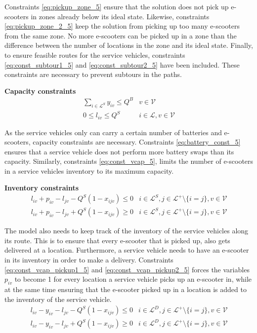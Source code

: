Constraints \eqref{eq:pickup_zone_5} ensure that the solution does not pick up e-scooters in zones already below its ideal state. Likewise, constraints \eqref{eq:pickup_zone_2_5} keep the solution from picking up too many e-scooters from the same zone. No more e-scooters can be picked up in a zone than the difference between the number of locations in the zone and its ideal state. Finally, to ensure feasible routes for the service vehicles, constraints \eqref{eq:const_subtour1_5} and \eqref{eq:const_subtour2_5} have been included. These constraints are necessary to prevent subtours in the paths.

\textbf{Capacity constraints}
\begin{eqnarray}
     \displaystyle\sum_{i\in \mathcal{L}^{S}}y_{iv} \leq Q^{B} &   v \in \mathcal{V} \label{eq:battery_const_5}\\
     0 \leq l_{iv} \leq Q^{S} & i \in \mathcal{L}, v \in \mathcal{V} \label{eq:const_vcap_5}
\end{eqnarray}

As the service vehicles only can carry a certain number of batteries and e-scooters, capacity constraints are necessary. Constraints \eqref{eq:battery_const_5} ensures that a service vehicle does not perform more battery swaps than its capacity.  Similarly, constraints \eqref{eq:const_vcap_5}, limits the number of e-scooters in a service vehicles inventory to its maximum capacity. 

\textbf{Inventory constraints}
\begin{eqnarray}
     l_{iv} + p_{iv} - l_{jv} - Q^{S}(1-x_{ijv}) \leq 0 & i \in \mathcal{L}^{S}, j \in \mathcal{L}^{+} \setminus\{i=j\}, v \in \mathcal{V} \label{eq:const_vcap_pickup1_5}\\
     l_{iv} + p_{iv} - l_{jv} + Q^{S}(1-x_{ijv}) \geq 0 & i \in \mathcal{L}^{S}, j \in \mathcal{L}^{+} \setminus\{i=j\}, v \in \mathcal{V} \label{eq:const_vcap_pickup2_5}
\end{eqnarray}

The model also needs to keep track of the inventory of the service vehicles along its route. This is to ensure that every e-scooter that is picked up, also gets delivered at a location. Furthermore, a service vehicle needs to have an e-scooter in its inventory in order to make a delivery. Constraints \eqref{eq:const_vcap_pickup1_5} and \eqref{eq:const_vcap_pickup2_5} forces the variables $p_{iv}$ to become 1 for every location a service vehicle picks up an e-scooter in, while at the same time ensuring that the e-scooter picked up in a location is added to the inventory of the service vehicle.
\begin{eqnarray}
    l_{iv} - y_{iv} - l_{jv} - Q^{S}(1-x_{ijv}) \leq 0 & i \in \mathcal{L}^{D}, j \in \mathcal{L}^{+} \setminus\{i=j\}, v \in \mathcal{V} \label{eq:const_vcap_delivery1_5}\\
	l_{iv} - y_{iv} - l_{jv} + Q^{S}(1-x_{ijv}) \geq 0 & i \in \mathcal{L}^{D}, j \in \mathcal{L}^{+} \setminus\{i=j\}, v \in \mathcal{V} \label{eq:const_vcap_delivery2_5} 
\end{eqnarray}

